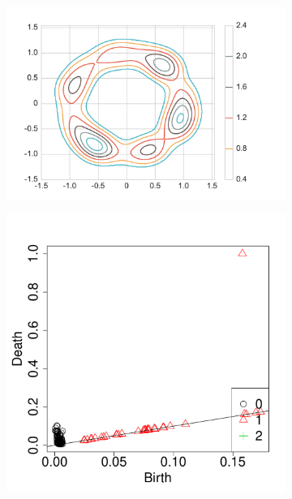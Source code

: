 \documentclass[12pt]{article}
\begin{document}
\begin{figure}
\begin{subfigure}{.25\linewidth}
    \label{fig:example_contour1}
  \end{subfigure}
    \begin{subfigure}{.25\linewidth}
    \centering
    \caption{}  
        \includegraphics[width=\linewidth]{figure_2_contour_2.pdf}
    \label{fig:example_contour2}
  \end{subfigure}
    \begin{subfigure}{.20\linewidth}
    \centering
    \caption{}  
        \includegraphics[width=\linewidth]{figure_2_pd.pdf}

\end{subfigure}
\end{figure}
\end{document}
